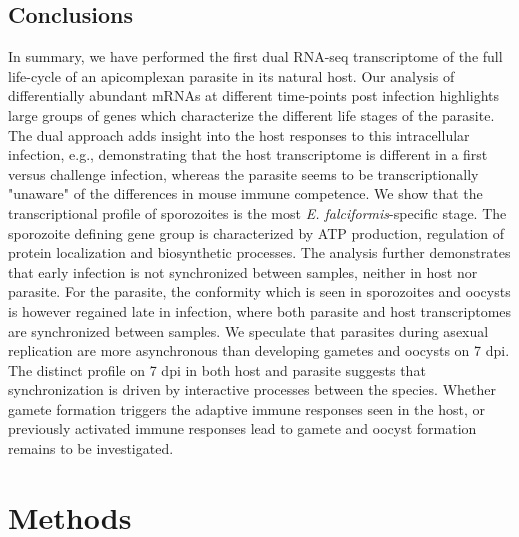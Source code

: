 \documentclass{bmcart}
\begin{document}
\subsection*{Conclusions}
In summary, we have performed the first dual RNA-seq transcriptome of the full life-cycle of an apicomplexan parasite in its natural host. Our analysis of differentially abundant mRNAs at different time-points post infection highlights large groups of genes which characterize the different life stages of the parasite. The dual approach adds insight into the host responses to this intracellular infection, e.g., demonstrating that the host transcriptome is different in a first versus challenge infection, whereas the parasite seems to be transcriptionally "unaware" of the differences in mouse immune competence. 
We show that the transcriptional profile of sporozoites is the most \textit{E. falciformis}-specific stage. The sporozoite defining gene group is characterized by ATP production, regulation of protein localization and biosynthetic processes. The analysis further demonstrates that early infection is not synchronized between samples, neither in host nor parasite. For the parasite, the conformity which is seen in sporozoites and oocysts is however regained late in infection, where both parasite and host transcriptomes are synchronized between samples. We speculate that parasites during asexual replication are more asynchronous than developing gametes and oocysts on 7 dpi. The distinct profile on 7 dpi in both host and parasite suggests that synchronization is driven by interactive processes between the species. Whether gamete formation triggers the adaptive immune responses seen in the host, or previously activated immune responses lead to gamete and oocyst formation remains to be investigated.

\section*{Methods}
\end{document}
